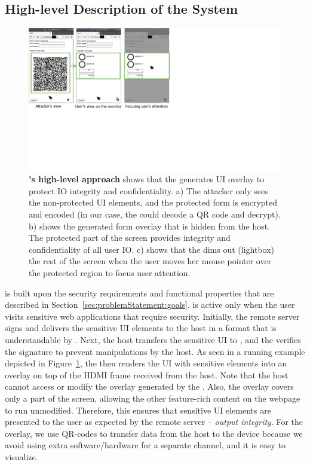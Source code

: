 \subsection{High-level Description of the System}

\begin{figure}[t]
\centering
\includegraphics[trim={0 8cm 15cm 0}, clip, width=\linewidth]{chapters/ProtectIOn/images/overlayScreenShot_new.pdf}
\caption{\textbf{\name's high-level approach} shows that the \device generates UI overlay to protect IO integrity and confidentiality. a) The attacker only sees the non-protected UI elements, and the protected form is encrypted and encoded (in our case, the \device could decode a QR code and decrypt). b) shows the \device generated form overlay that is hidden from the host. The protected part of the screen provides integrity and confidentiality of all user IO. c) shows that the \device dims out (lightbox) the rest of the screen when the user moves her mouse pointer over the protected region to focus user attention.}

\label{fig:screenshot_1}
\end{figure}

\name is built upon the security requirements and functional properties that are described in Section~\ref{sec:problemStatement:goals}.
\device is active only when the user visits sensitive web applications that require \name security.
Initially, the remote server signs and delivers the sensitive UI elements to the host in a format that is understandable by \device. Next, the host transfers the sensitive UI to \device, and the \device verifies the signature to prevent manipulations by the host. As seen in a running example depicted in Figure~\ref{fig:screenshot_1}, the \device then renders the UI with sensitive elements into an overlay on top of the HDMI frame received from the host. Note that the host cannot access or modify the overlay generated by the \device. Also, the overlay covers only a part of the screen, allowing the other feature-rich content on the webpage to run unmodified. Therefore, this ensures that sensitive UI elements are presented to the user as expected by the remote server -- \emph{output integrity}. For the overlay, we use QR-codes to transfer data from the host to the device because we avoid using extra software/hardware for a separate channel, and it is easy to visualize.

